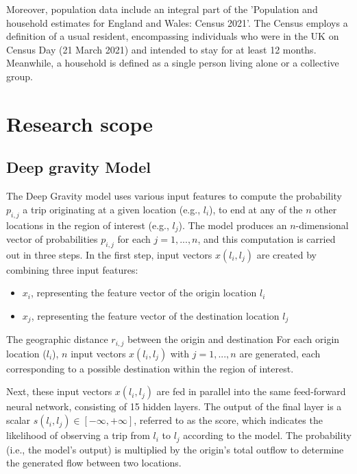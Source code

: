     Moreover, population data include an integral part of the 'Population and household estimates for England and Wales: Census 2021'. The Census employs a definition of a usual resident, encompassing individuals who were in the UK on Census Day (21 March 2021) and intended to stay for at least 12 months. Meanwhile, a household is defined as a single person living alone or a collective group.
        

    \section{Research scope}

        \subsection{Deep gravity Model}


The Deep Gravity model uses various input features to compute the probability $p_{i,j}$ a trip originating at a given location (e.g., $l_i$), to end at any of the $n$ other locations in the region of interest (e.g., $l_j$). The model produces an $n$-dimensional vector of probabilities $p_{i,j}$ for each $j = 1, ..., n$, and this computation is carried out in three steps.
In the first step, input vectors $x(l_i, l_j)$ are created by combining three input features:

\begin{itemize}
        \item $x_i$, representing the feature vector of the origin location $l_i$
        \item $x_j$, representing the feature vector of the destination location $l_j$
\end{itemize}
The geographic distance $r_{i,j}$ between the origin and destination
For each origin location ($l_i$), $n$ input vectors $x(l_i, l_j)$ with $j = 1, ..., n$ are generated, each corresponding to a possible destination within the region of interest.

Next, these input vectors $x(l_i, l_j)$ are fed in parallel into the same feed-forward neural network, consisting of 15 hidden layers. The output of the final layer is a scalar $s(l_i, l_j) \in [-\infty, +\infty]$, referred to as the score, which indicates the likelihood of observing a trip from $l_i$ to $l_j$ according to the model. The probability (i.e., the model's output) is multiplied by the origin's total outflow to determine the generated flow between two locations.


